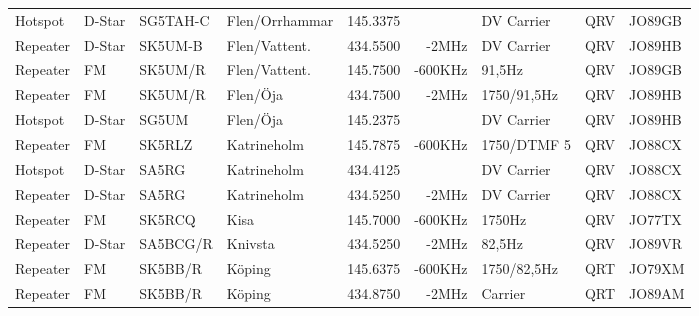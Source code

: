 \begin{landscape}
\begin{longtable}{llllrrlcl}
	Hotspot                   & D-Star        & SG5TAH-C      & Flen/Orrhammar      & 145.3375          &                & DV Carrier       & QRV             & JO89GB           \\
	Repeater                  & D-Star        & SK5UM-B       & Flen/Vattent.       & 434.5500          & -2MHz          & DV Carrier       & QRV             & JO89HB           \\
	Repeater                  & FM            & SK5UM/R       & Flen/Vattent.       & 145.7500          & -600KHz        & 91,5Hz           & QRV             & JO89GB           \\
	Repeater                  & FM            & SK5UM/R       & Flen/Öja            & 434.7500          & -2MHz          & 1750/91,5Hz      & QRV             & JO89HB           \\
	Hotspot                   & D-Star        & SG5UM         & Flen/Öja            & 145.2375          &                & DV Carrier       & QRV             & JO89HB           \\
	Repeater                  & FM            & SK5RLZ        & Katrineholm         & 145.7875          & -600KHz        & 1750/DTMF 5      & QRV             & JO88CX           \\
	Hotspot                   & D-Star        & SA5RG         & Katrineholm         & 434.4125          &                & DV Carrier       & QRV             & JO88CX           \\
	Repeater                  & D-Star        & SA5RG         & Katrineholm         & 434.5250          & -2MHz          & DV Carrier       & QRV             & JO88CX           \\
	Repeater                  & FM            & SK5RCQ        & Kisa                & 145.7000          & -600KHz        & 1750Hz           & QRV             & JO77TX           \\
	Repeater                  & D-Star        & SA5BCG/R      & Knivsta             & 434.5250          & -2MHz          & 82,5Hz           & QRV             & JO89VR           \\
	Repeater                  & FM            & SK5BB/R       & Köping              & 145.6375          & -600KHz        & 1750/82,5Hz      & QRT             & JO79XM           \\
	Repeater                  & FM            & SK5BB/R       & Köping              & 434.8750          & -2MHz          & Carrier          & QRT             & JO89AM           \\

\end{longtable}
\end{landscape}
